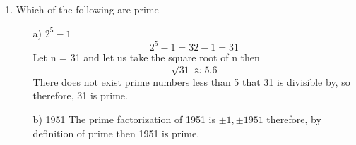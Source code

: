 \documentclass[12pt]{article}
\begin{document}
\begin{enumerate}
\begin{itemize}
   \end{itemize}
   \item Which of the following are prime 
   \begin{itemize}
       \item[a)] $2^{5} - 1$
       \begin{equation*}
           2^5 - 1 = 32 - 1 = 31
       \end{equation*}
       Let n = 31 and let us take the square root of n then 
       \begin{equation*}
           \sqrt{31} \approx 5.6
       \end{equation*}
       There does not exist prime numbers less than 5 that 31 is divisible by, so therefore, 31 is prime. 
       \item[b)] 1951 \newline 
       The prime factorization of 1951 is $\pm 1, \pm 1951$ therefore, by definition of prime then 1951 is prime. 
       
   \end{itemize}
\end{enumerate}
\end{document}
